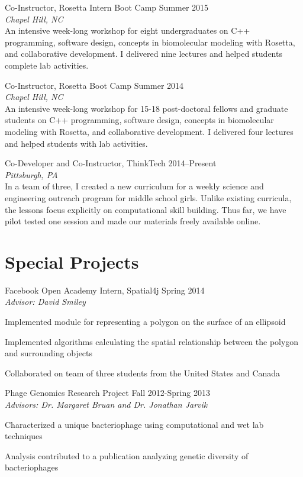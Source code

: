\documentclass[11pt]{article}
\newcommand{\allcapsspacing}[1]{{\addfontfeature{LetterSpace=7.5}#1}}
\newcommand{\outreachitem}[4]{
{#1} \hfill {#2} \\
#3 \smallskip
#4 
\par\vspace{0.5\baselineskip}}
\newcommand{\researchitem}[4]{
\outreachitem{#1}{#2}{\textit{#3}}{\vspace{0\baselineskip}#4}}
\begin{document}
\researchitem{Co-Instructor, Rosetta Intern Boot Camp}{Summer 2015}{Chapel Hill, NC}{\\An intensive week-long workshop for eight undergraduates on C++ programming, software design, concepts in biomolecular modeling with Rosetta, and collaborative development. I delivered nine lectures and helped students complete lab activities.}

\researchitem{Co-Instructor, Rosetta Boot Camp}{Summer 2014}{Chapel Hill, NC}{\\An intensive week-long workshop for 15-18 post-doctoral fellows and graduate students on C++ programming, software design, concepts in biomolecular modeling with Rosetta, and collaborative development. I delivered four lectures and helped students with lab activities.}

\researchitem{Co-Developer and Co-Instructor, ThinkTech}{2014--Present}{Pittsburgh, PA}{\\In a team of three, I created a new curriculum for a weekly science and engineering outreach program for middle school girls. Unlike existing curricula, the lessons focus explicitly on computational skill building. Thus far, we have pilot tested one session and made our materials freely available online.}

\section*{\allcapsspacing{Special Projects}}

\researchitem{Facebook Open Academy Intern, Spatial4j}{Spring 2014}{Advisor: David Smiley}{
\begin{compactitem}
\item Implemented module for representing a polygon on the surface of an ellipsoid
\item Implemented algorithms calculating the spatial relationship between the polygon and surrounding objects
\item Collaborated on team of three students from the United States and Canada
\end{compactitem}
}

\researchitem{Phage Genomics Research Project}{Fall 2012-Spring 2013}{Advisors: Dr. Margaret Bruan and Dr. Jonathan Jarvik}{
\begin{compactitem}
\item Characterized a unique bacteriophage using computational and wet lab techniques
\item Analysis contributed to a publication analyzing genetic diversity of bacteriophages
\end{compactitem}
}
\end{document}
